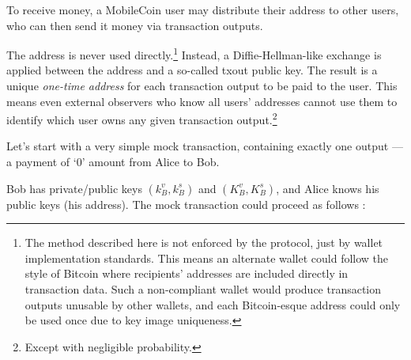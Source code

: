 To receive money, a MobileCoin user may distribute their address to other users, who can then send it money via transaction outputs.

The address is never used directly.\footnote{\label{footnote:address-wallet-standards}The method described here is not enforced by the protocol, just by wallet implementation standards. This means an alternate wallet could follow the style of Bitcoin where recipients' addresses are included directly in transaction data. Such a non-compliant wallet would produce transaction outputs unusable by other wallets, and each Bitcoin-esque address could only be used once due to key image uniqueness.} Instead, a Diffie-Hellman-like exchange is applied between the address and a so-called txout public key. The result is a unique {\em one-time address} for each transaction output to be paid to the user. This means even external observers who know all users’ addresses cannot use them to identify which user owns any given transaction output.\footnote{Except with negligible probability.}


Let’s start with a very simple mock transaction, containing exactly one output --- a payment of `0' amount from Alice to Bob.

Bob has private/public keys $(k_B^v, k_B^s)$ and $(K_B^v, K_B^s)$, and Alice knows his public keys (his address). The mock transaction could proceed as follows \cite{cryptoNoteWhitePaper}:

